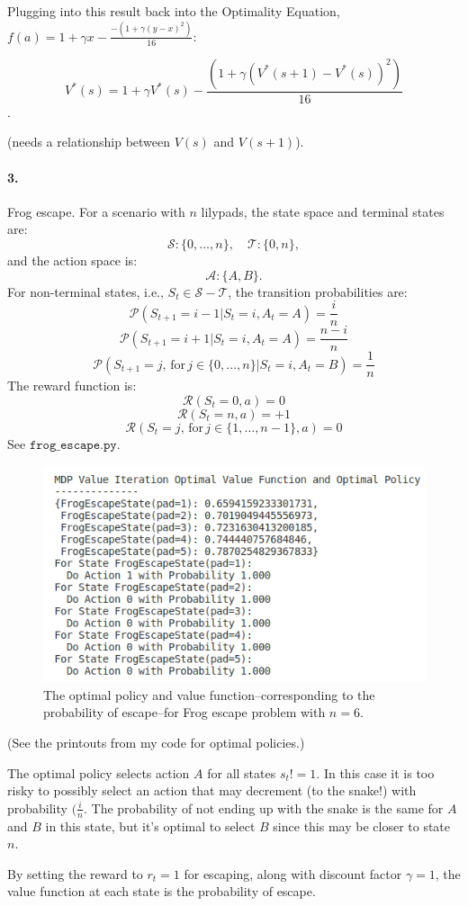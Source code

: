 \documentclass[12pt]{article}
\begin{document}
Plugging into this result back into the Optimality Equation, $f(a) = 1 + \gamma x - \frac{-(1 + \gamma (y - x)^2)}{16}$:

$$V^{*}(s) = 1 + \gamma V^{*}(s) - \frac{(1 + \gamma (V^{*}(s+1) - V^{*}(s))^2)}{16}$$.

(needs a relationship between $V(s)$ and $V(s+1)$).

\paragraph{3.} Frog escape. For a scenario with $n$ lilypads, the state space and terminal states are: 
$$\mathcal{S} : \{0, \dots, n\}, \quad \mathcal{T} : \{0, n\},$$
and the action space is:
$$\mathcal{A} : \{A, B\}.$$ For non-terminal states, i.e., $S_t \in \mathcal{S} - \mathcal{T}$, the transition probabilities are:
$$\mathcal{P}(S_{t+1} = i-1 | S_t = i, A_t = A) = \frac{i}{n}$$
$$\mathcal{P}(S_{t+1} = i+1 | S_t = i, A_t = A) = \frac{n-i}{n}$$
$$\mathcal{P}(S_{t+1} = j,\,\mbox{for}\, j \in \{0, \dots, n\} | S_t = i, A_t = B) = \frac{1}{n}$$
The reward function is:
$$\mathcal{R}(S_t = 0, a) = 0 $$
$$\mathcal{R}(S_t = n, a) = +1 $$
$$\mathcal{R}(S_{t} = j,\,\mbox{for}\,j \in \{1, \dots, n-1\}, a) = 0 $$
See $\texttt{frog\_escape.py}$.

\begin{figure}[h]
	\centering
	\includegraphics[width=.5\textwidth]{frog_escape_n6.png}
	\caption{The optimal policy and value function--corresponding to the probability of escape--for Frog escape problem with $n = 6$.}
\end{figure}
(See the printouts from my code for optimal policies.)

The optimal policy selects action $A$ for all states $s_t != 1$. In this case it is too risky to possibly select an action that may decrement (to the snake!) with probability $(\frac{i}{n}$. The probability of not ending up with the snake is the same for $A$ and $B$ in this state, but it's optimal to select $B$ since this may be closer to state $n$.

By setting the reward to $r_t = 1$ for escaping, along with discount factor $\gamma = 1$, the value function at each state is the probability of escape. 
\end{document}
